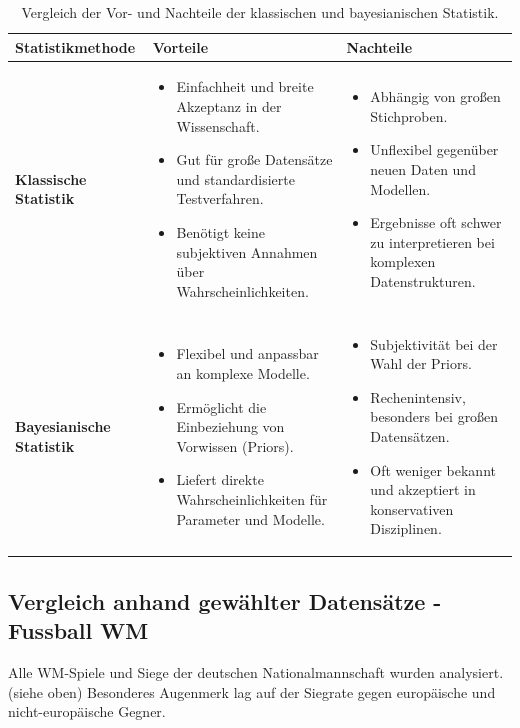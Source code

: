 \documentclass[a4paper,12pt]{article}
\begin{document}
\newpage
\begin{table}[h!]
  \centering
  \begin{tabular}{|p{4cm}|p{5cm}|p{5cm}|}
  \hline
  \textbf{Statistikmethode} & \textbf{Vorteile} & \textbf{Nachteile} \\ \hline
  \textbf{Klassische Statistik} & 
  \begin{itemize}
      \item Einfachheit und breite Akzeptanz in der Wissenschaft.
      \item Gut für große Datensätze und standardisierte Testverfahren.
      \item Benötigt keine subjektiven Annahmen über Wahrscheinlichkeiten.
  \end{itemize} & 
  \begin{itemize}
      \item Abhängig von großen Stichproben.
      \item Unflexibel gegenüber neuen Daten und Modellen.
      \item Ergebnisse oft schwer zu interpretieren bei komplexen Datenstrukturen.
  \end{itemize} \\ \hline
  \textbf{Bayesianische Statistik} & 
  \begin{itemize}
      \item Flexibel und anpassbar an komplexe Modelle.
      \item Ermöglicht die Einbeziehung von Vorwissen (Priors).
      \item Liefert direkte Wahrscheinlichkeiten für Parameter und Modelle.
  \end{itemize} & 
  \begin{itemize}
      \item Subjektivität bei der Wahl der Priors.
      \item Rechenintensiv, besonders bei großen Datensätzen.
      \item Oft weniger bekannt und akzeptiert in konservativen Disziplinen.
  \end{itemize} \\ \hline
  \end{tabular}
  \caption{Vergleich der Vor- und Nachteile der klassischen und bayesianischen Statistik.}
  \label{tab:vergleich_vor_nachteile}
\end{table}

\subsection{Vergleich anhand gewählter Datensätze - Fussball WM}
Alle WM-Spiele und Siege der deutschen Nationalmannschaft wurden analysiert. (siehe oben)
Besonderes Augenmerk lag auf der Siegrate gegen europäische und nicht-europäische Gegner. \\
\end{document}
